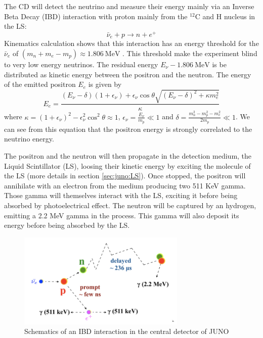 \documentclass[../main.tex]{subfiles}
\begin{document}
The CD will detect the neutrino and measure their energy mainly via an Inverse Beta Decay (IBD) interaction with proton mainly from the $^{12}$C and H nucleus in the LS:
\begin{equation*}
  \bar{\nu}_e + p \rightarrow n + e^+
\end{equation*}
Kinematics calculation shows that this interaction has an energy threshold for the $\bar{\nu}_e$ of $ (m_n + m_e - m_p ) \approx 1.806 ~ \mathrm{MeV}$ \cite{strumia_precise_2003}.
This threshold make the experiment blind to very low energy neutrinos. The residual energy $E_{\nu} - 1.806 ~ \mathrm{MeV}$ is be distributed as kinetic energy between the positron and the neutron.
The energy of the emitted positron $E_e$ is given by \cite{strumia_precise_2003}
\begin{equation}
  E_e = \frac{(E_\nu - \delta)(1+\epsilon_\nu) + \epsilon_\nu \cos \theta \sqrt{(E_\nu - \delta)^2 + \kappa m_e^2}}{\kappa}
\end{equation}
where $\kappa = (1 + \epsilon_\nu)^2 - \epsilon_\nu^2 \cos^2 \theta \approx 1$, $\epsilon_\nu = \frac{E_\nu}{m_p} \ll 1$ and $\delta = \frac{m_n^2 - m_p^2 - m_e^2}{2m_p} \ll 1$.
We can see from this equation that the positron energy is strongly correlated to the neutrino energy.


The positron and the neutron will then propagate in the detection medium, the Liquid Scintillator (LS), loosing their kinetic energy by exciting the molecule of the LS (more details in section \ref{sec:juno:LS}). Once stopped, the positron will annihilate with an electron from the medium producing two 511 KeV gamma. Those gamma will themselves interact with the LS, exciting it before being absorbed by photoelectrical effect. The neutron will be captured by an hydrogen, emitting a 2.2 MeV gamma in the process. This gamma will also deposit its energy before being absorbed by the LS.

\begin{figure}[ht]
  \centering
  \includegraphics[width=8cm]{images/juno/IDB-JUNO.png}
  \caption{Schematics of an IBD interaction in the central detector of JUNO}
  \label{fig:juno:IBD}
\end{figure}
\end{document}
